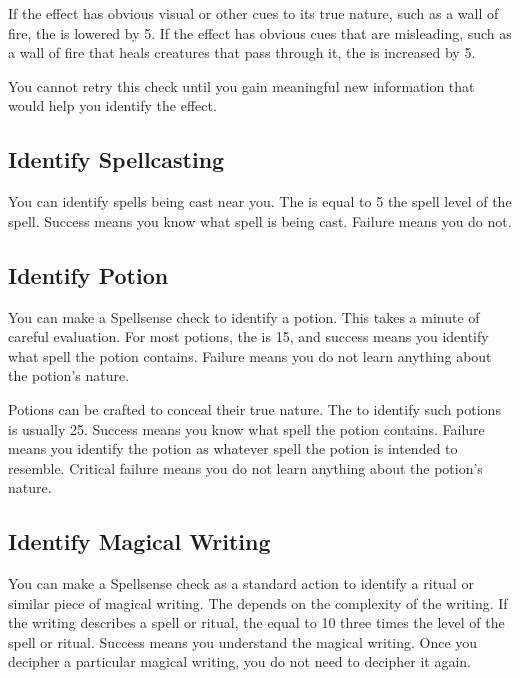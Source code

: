         If the effect has obvious visual or other cues to its true nature, such as a wall of fire, the  is lowered by 5.
        If the effect has obvious cues that are misleading, such as a wall of fire that heals creatures that pass through it, the  is increased by 5.

        You cannot retry this check until you gain meaningful new information that would help you identify the effect.

    \subsection{Identify Spellcasting}
        You can identify spells being cast near you.
        The  is equal to 5 \add the spell level of the spell.
        Success means you know what spell is being cast.
        Failure means you do not.

    \subsection{Identify Potion}
        You can make a  Spellsense check to identify a potion.
        This takes a minute of careful evaluation.
        For most potions, the  is 15, and success means you identify what spell the potion contains.
        Failure means you do not learn anything about the potion's nature.

        Potions can be crafted to conceal their true nature.
        The  to identify such potions is usually 25.
        Success means you know what spell the potion contains.
        Failure means you identify the potion as whatever spell the potion is intended to resemble.
        Critical failure means you do not learn anything about the potion's nature.

    \subsection{Identify Magical Writing}\label{Identify Magical Writing}
        You can make a Spellsense check as a standard action to identify a ritual or similar piece of magical writing.
        The  depends on the complexity of the writing.
        If the writing describes a spell or ritual, the  equal to 10 \add three times the level of the spell or ritual.
        Success means you understand the magical writing.
        Once you decipher a particular magical writing, you do not need to decipher it again.

